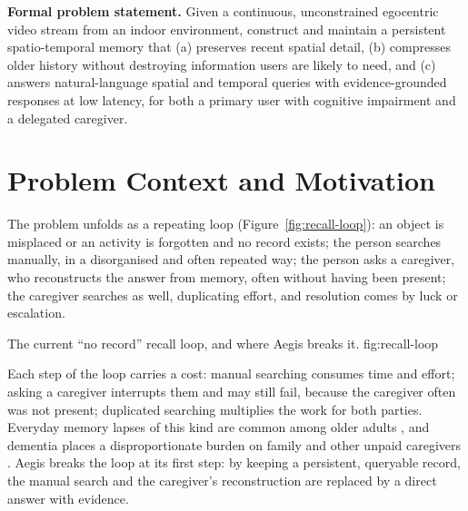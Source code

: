 \noindent\textbf{Formal problem statement.} Given a continuous, unconstrained
egocentric video stream from an indoor environment, construct and maintain a
persistent spatio-temporal memory that (a) preserves recent spatial detail,
(b) compresses older history without destroying information users are likely
to need, and (c) answers natural-language spatial and temporal queries with
evidence-grounded responses at low latency, for both a primary user with
cognitive impairment and a delegated caregiver.

\section{Problem Context and Motivation}
The problem unfolds as a repeating loop (Figure~\ref{fig:recall-loop}): an
object is misplaced or an activity is forgotten and no record exists; the
person searches manually, in a disorganised and often repeated way; the person
asks a caregiver, who reconstructs the answer from memory, often without having
been present; the caregiver searches as well, duplicating effort, and
resolution comes by luck or escalation.

  {The current ``no record'' recall loop, and where Aegis breaks it.}
  {fig:recall-loop}

Each step of the loop carries a cost: manual searching consumes time and
effort; asking a caregiver interrupts them and may still fail, because the
caregiver often was not present; duplicated searching multiplies the work for
both parties. Everyday memory lapses of this kind are common among older adults
\cite{mogle2023,marchant2011}, and dementia places a disproportionate burden on
family and other unpaid caregivers \cite{kasper2015}. Aegis breaks the loop at
its first step: by keeping a persistent, queryable record, the manual search
and the caregiver's reconstruction are replaced by a direct answer with
evidence.

